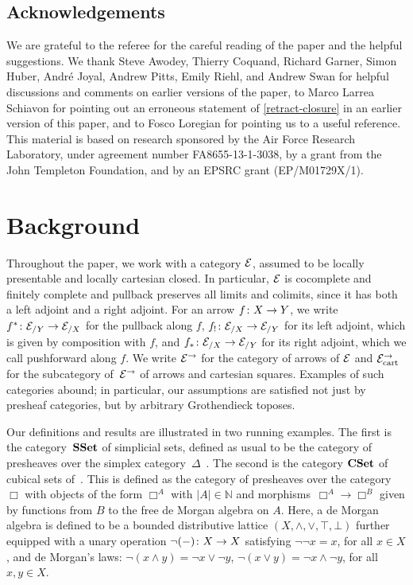 \documentclass[reqno,10pt,a4paper,oneside,draft]{amsart}
\begin{document}
\subsection*{Acknowledgements} We are grateful to the referee for the careful reading of the paper and the
helpful suggestions. 
We thank Steve Awodey, Thierry Coquand, Richard Garner, Simon Huber, Andr\'e Joyal, Andrew Pitts, Emily Riehl, and Andrew Swan for helpful discussions and comments on earlier versions of the paper, to Marco Larrea Schiavon for pointing out an erroneous statement of \cref{retract-closure} in an earlier version of this paper, and to Fosco Loregian for pointing us to a useful reference.
This material is based on research sponsored by the Air Force Research Laboratory, under agreement number FA8655-13-1-3038, by a grant from the John Templeton Foundation, and by an EPSRC grant (EP/M01729X/1).

\section{Background}
\label{sec:bac}

Throughout the paper, we work with a category $\cal{E}$, assumed to be locally presentable and locally cartesian closed.
In particular, $\catE$ is cocomplete and finitely complete and pullback preserves all limits and colimits, since it has both a left adjoint and a right adjoint.
For an arrow $f \co X \to Y$, we write $f^* \co \cal{E}_{/Y} \to \cal{E}_{/X}$ for the pullback along $f$, $f_{!} \co \cal{E}_{/X} \to \cal{E}_{/Y}$ for its left adjoint, which is given by composition with $f$, and $f_* \co \cal{E}_{/X} \to \cal{E}_{/Y}$ for its right adjoint, which we call pushforward along $f$.
We write $\cal{E}^\to$ for the category of arrows of $\cal{E}$ and $\cal{E}^\to_{\mathrm{cart}}$ for the subcategory of~$\cal{E}^\to$ of arrows and cartesian squares.
Examples of such categories abound; in particular, our assumptions are satisfied not just by presheaf categories, but by arbitrary Grothendieck toposes.

Our definitions and results are illustrated in two running examples.
The first is the category~$\SSet$ of simplicial sets, defined as usual to be the category of presheaves over the simplex category~$\Delta$~\cite{goerss-jardine}.
The second is the category $\CSet$ of cubical sets of~\cite{cohen-et-al:cubicaltt}.
This is defined as the category of presheaves over the category $\Box$ with objects of the form $\Box^A$ with $|A| \in \mathbb{N}$ and morphisms~$\Box^A \to \Box^B$ given by functions from $B$ to the free de Morgan algebra on
$A$. Here, a de Morgan algebra is defined to be a bounded distributive lattice $(X, \land, \lor, \top, \bot)$ further equipped with a unary operation $\neg (-) \co X \to X$ satisfying $\neg \neg x = x$, for all $x \in X$, and de Morgan's laws: $\neg (x \land y) = \neg x \lor \neg y$, $\neg (x \lor y) = \neg x \land \neg y$, for all $x, y \in X$.
\end{document}
